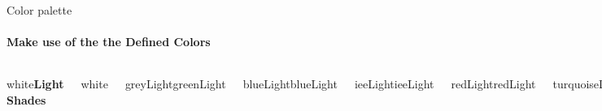 \documentclass[aspectratio=169]{beamer}
\begin{document}
\begin{frame}{Color palette}
    \framesubtitle{Make use of the the Defined Colors}
    \label{frame:color_palette}
    
    \vspace{1cm}
    \begin{columns}[t]
            \begin{beamercolorbox}[center,colsep*=4pt]{white}\textbf{Light Shades}\strut\end{beamercolorbox}
            \begin{beamercolorbox}[center,colsep*=4pt]{white}\strut\end{beamercolorbox}
            \begin{beamercolorbox}[center,colsep*=4pt]{greyLight}greenLight\strut\end{beamercolorbox}
            \begin{beamercolorbox}[center,colsep*=4pt]{blueLight}blueLight\strut\end{beamercolorbox}
            \begin{beamercolorbox}[center,colsep*=4pt]{ieeLight}ieeLight\strut\end{beamercolorbox}
            \begin{beamercolorbox}[center,colsep*=4pt]{redLight}redLight\strut\end{beamercolorbox}
            \begin{beamercolorbox}[center,colsep*=4pt]{turquoiseLight}turquoiseLight\strut\end{beamercolorbox}
            \begin{beamercolorbox}[center,colsep*=4pt]{greenLight}greenLight\strut\end{beamercolorbox}
            \begin{beamercolorbox}[center,colsep*=4pt]{yellowLight}yellowLight\strut\end{beamercolorbox}
            \begin{beamercolorbox}[center,colsep*=4pt]{white}\textbf{Standard}\strut\end{beamercolorbox}
            \begin{beamercolorbox}[center,colsep*=4pt]{white}\strut\end{beamercolorbox}
            \begin{beamercolorbox}[center,colsep*=4pt]{grey}grey\strut\end{beamercolorbox}
            \begin{beamercolorbox}[center,colsep*=4pt]{blue}blue\strut\end{beamercolorbox}

\end{columns}
\end{frame}
\end{document}
